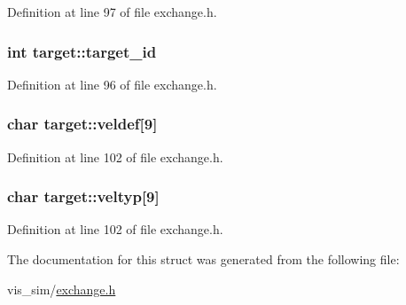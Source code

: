 Definition at line 97 of file exchange.h.

\hypertarget{structtarget_ad3c38e38d2f63ed0abd4d6b78825fd18}{
\subsubsection[{target\_\-id}]{\setlength{\rightskip}{0pt plus 5cm}int {\bf target::target\_\-id}}}
\label{structtarget_ad3c38e38d2f63ed0abd4d6b78825fd18}


Definition at line 96 of file exchange.h.

\hypertarget{structtarget_ad60c3645c54b790063f193bee1408477}{
\subsubsection[{veldef}]{\setlength{\rightskip}{0pt plus 5cm}char {\bf target::veldef}\mbox{[}9\mbox{]}}}
\label{structtarget_ad60c3645c54b790063f193bee1408477}


Definition at line 102 of file exchange.h.

\hypertarget{structtarget_a18183dc4d60e923b73d3415122b8b5fe}{
\subsubsection[{veltyp}]{\setlength{\rightskip}{0pt plus 5cm}char {\bf target::veltyp}\mbox{[}9\mbox{]}}}
\label{structtarget_a18183dc4d60e923b73d3415122b8b5fe}


Definition at line 102 of file exchange.h.



The documentation for this struct was generated from the following file:\begin{DoxyCompactItemize}
\item 
vis\_\-sim/\hyperlink{exchange_8h}{exchange.h}\end{DoxyCompactItemize}
